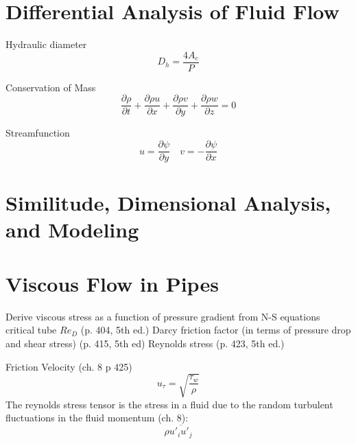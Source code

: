 \documentclass{article}
\begin{document}
%
%
\newpage
\section{Differential Analysis of Fluid Flow}

Hydraulic diameter
\begin{equation}
  D_h = \frac{4A_c}{P}
\end{equation}

Conservation of Mass
\begin{equation}
  \frac{\partial\rho}{\partial t} + \frac{\partial\rho u}{\partial x} +\frac{\partial\rho v}{\partial y} +\frac{\partial\rho w}{\partial z} = 0
\end{equation}

Streamfunction
\begin{equation}
  u=\frac{\partial\psi}{\partial y}\quad v=-\frac{\partial\psi}{\partial x}
\end{equation}

%
%
\newpage
\section{Similitude, Dimensional Analysis, and Modeling}



%
%
\newpage
\section{Viscous Flow in Pipes}

Derive viscous stress as a function of pressure gradient from N-S equations
critical tube $Re_D$ (p. 404, 5th ed.)
Darcy friction factor (in terms of pressure drop and shear stress) (p. 415, 5th ed)
Reynolds stress (p. 423, 5th ed.)

Friction Velocity (ch. 8 p 425)
\begin{equation}
  u_\tau = \sqrt{\frac{\tau_w}{\rho}}
\end{equation}
\newline
\newline
The reynolds stress tensor is the stress in a fluid due to the random turbulent fluctuations in the fluid momentum (ch. 8):
\begin{equation}
  \rho \overline{u'_i u'_j}
\end{equation}
\end{document}
